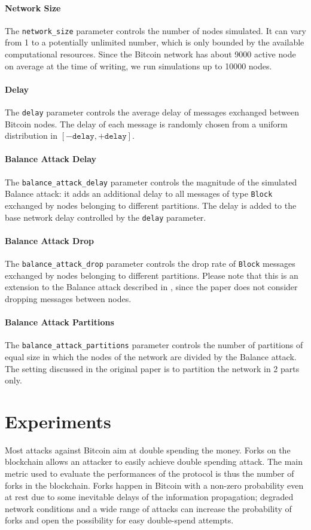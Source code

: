 \paragraph{Network Size}
The \texttt{network\_size} parameter controls the number of nodes simulated.
It can vary from \num{1} to a potentially unlimited number, which is only bounded by the available computational resources.
Since the Bitcoin network has about \num{9000} active node on average at the time of writing, we run simulations up to \num{10000} nodes.

\paragraph{Delay}
The \texttt{delay} parameter controls the average delay of messages exchanged between Bitcoin nodes.
The delay of each message is randomly chosen from a uniform distribution in $[-\texttt{delay}, +\texttt{delay}]$.

\paragraph{Balance Attack Delay}
The \texttt{balance\_attack\_delay} parameter controls the magnitude of the simulated Balance attack:
it adds an additional delay to all messages of type \texttt{Block} exchanged by nodes belonging to different partitions.
The delay is added to the base network delay controlled by the \texttt{delay} parameter.

\paragraph{Balance Attack Drop}
The \texttt{balance\_attack\_drop} parameter controls the drop rate of \texttt{Block} messages exchanged by nodes belonging to different partitions.
Please note that this is an extension to the Balance attack described in \cite{balance_attack_2017}, since the paper does not consider dropping messages between nodes.

\paragraph{Balance Attack Partitions}
The \texttt{balance\_attack\_partitions} parameter controls the number of partitions of equal size in which the nodes of the network are divided by the Balance attack.
The setting discussed in the original paper is to partition the network in \num{2} parts only.


\section{Experiments}
Most attacks against Bitcoin aim at double spending the money.
Forks on the blockchain allows an attacker to easily achieve double spending attack.
The main metric used to evaluate the performances of the protocol is thus the number of forks in the blockchain.
Forks happen in Bitcoin with a non-zero probability even at rest due to some inevitable delays of the information propagation;
degraded network conditions and a wide range of attacks can increase the probability of forks and open the possibility for easy double-spend attempts.

